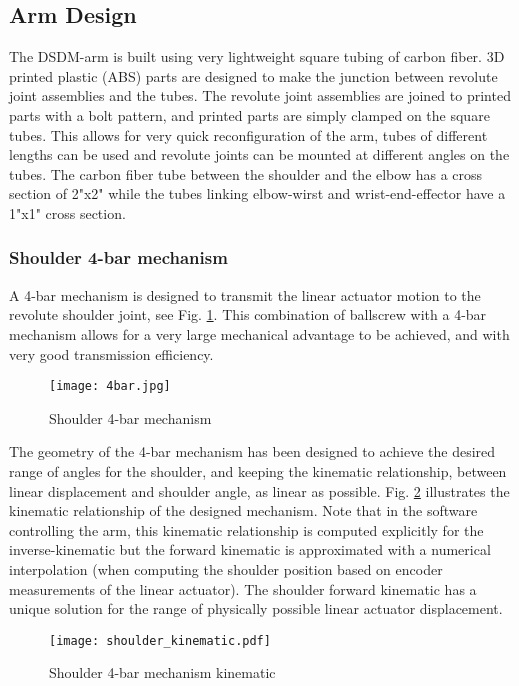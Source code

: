 \subsection{Arm Design}
\label{sec:DSDMArm}

The DSDM-arm is built using very lightweight square tubing of carbon fiber. 3D printed plastic (ABS) parts are designed to make the junction between revolute joint assemblies and the tubes. The revolute joint assemblies are joined to printed parts with a bolt pattern, and printed parts are simply clamped on the square tubes. This allows for very quick reconfiguration of the arm, tubes of different lengths can be used and revolute joints can be mounted at different angles on the tubes. The carbon fiber tube between the shoulder and the elbow has a cross section of 2"x2" while the tubes linking elbow-wirst and wrist-end-effector have a 1"x1" cross section. 

\subsubsection{Shoulder 4-bar mechanism}

A 4-bar mechanism is designed to transmit the linear actuator motion to the revolute shoulder joint, see Fig. \ref{fig:4bar}. This combination of ballscrew with a 4-bar mechanism allows for a very large mechanical advantage to be achieved, and with very good transmission efficiency.  

\begin{figure}[htbp]
	\centering
		\texttt{[image: 4bar.jpg]}
	\caption{Shoulder 4-bar mechanism}
	\label{fig:4bar}
\end{figure}

The geometry of the 4-bar mechanism has been designed to achieve the desired range of angles for the shoulder, and keeping the kinematic relationship, between linear displacement and shoulder angle, as linear as possible. Fig. \ref{fig:shoulder_kinematic} illustrates the kinematic relationship of the designed mechanism. Note that in the software controlling the arm, this kinematic relationship is computed explicitly for the inverse-kinematic but the forward kinematic is approximated with a numerical interpolation (when computing the shoulder position based on encoder measurements of the linear actuator). The shoulder forward kinematic has a unique solution for the range of physically possible linear actuator displacement.

\begin{figure}[htbp]
	\centering
		\texttt{[image: shoulder\_kinematic.pdf]}
	\caption{Shoulder 4-bar mechanism kinematic}
	\label{fig:shoulder_kinematic}
\end{figure}

